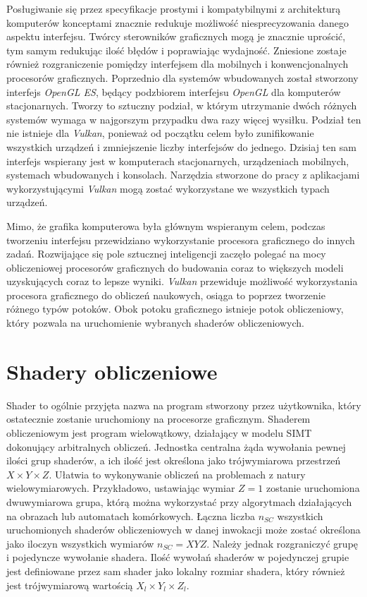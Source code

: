 Posługiwanie się przez specyfikacje prostymi i kompatybilnymi z architekturą komputerów konceptami znacznie redukuje możliwość niesprecyzowania danego aspektu interfejsu.
Twórcy sterowników graficznych mogą je znacznie uprościć, tym samym redukując ilość błędów i poprawiając wydajność. Zniesione zostaje również rozgraniczenie pomiędzy interfejsem dla mobilnych i konwencjonalnych procesorów graficznych.
Poprzednio dla systemów wbudowanych został stworzony interfejs \textit{OpenGL ES}, będący podzbiorem interfejsu \textit{OpenGL} dla komputerów stacjonarnych.
Tworzy to sztuczny podział, w którym utrzymanie dwóch różnych systemów wymaga w najgorszym przypadku dwa razy więcej wysiłku.
Podział ten nie istnieje dla \textit{Vulkan}, ponieważ od początku celem było zunifikowanie wszystkich urządzeń i zmniejszenie liczby interfejsów do jednego.
Dzisiaj ten sam interfejs wspierany jest w komputerach stacjonarnych, urządzeniach mobilnych, systemach wbudowanych i konsolach.
Narzędzia stworzone do pracy z aplikacjami wykorzystującymi \textit{Vulkan} mogą zostać wykorzystane we wszystkich typach urządzeń.

Mimo, że grafika komputerowa była głównym wspieranym celem, podczas tworzeniu interfejsu przewidziano wykorzystanie procesora graficznego do innych zadań.
Rozwijające się pole sztucznej inteligencji zaczęło polegać na mocy obliczeniowej procesorów graficznych do budowania coraz to większych modeli uzyskujących coraz to lepsze wyniki.
\textit{Vulkan} przewiduje możliwość wykorzystania procesora graficznego do obliczeń naukowych, osiąga to poprzez tworzenie różnego typów potoków.
Obok potoku graficznego istnieje potok obliczeniowy, który pozwala na uruchomienie wybranych shaderów obliczeniowych.

\section{Shadery obliczeniowe}
\label{sec:shader_comp}

Shader to ogólnie przyjęta nazwa na program stworzony przez użytkownika, który ostatecznie zostanie uruchomiony na procesorze graficznym.
Shaderem obliczeniowym jest program wielowątkowy, działający w modelu SIMT dokonujący arbitralnych obliczeń.
Jednostka centralna żąda wywołania pewnej ilości grup shaderów, a ich ilość jest określona jako trójwymiarowa przestrzeń $X \times Y \times Z$.
Ułatwia to wykonywanie obliczeń na problemach z natury wielowymiarowych.
Przykładowo, ustawiając wymiar $Z = 1$ zostanie uruchomiona dwuwymiarowa grupa, którą można wykorzystać przy algorytmach działających na obrazach lub automatach komórkowych.
Łączna liczba $n_{SC}$ wszystkich uruchomionych shaderów obliczeniowych w danej inwokacji może zostać określona jako iloczyn wszystkich wymiarów $n_{SC} = XYZ$.
Należy jednak rozgraniczyć grupę i pojedyncze wywołanie shadera.
Ilość wywołań shaderów w pojedynczej grupie jest definiowane przez sam shader jako lokalny rozmiar shadera, który również jest trójwymiarową wartością $X_l \times Y_l \times Z_l$.


